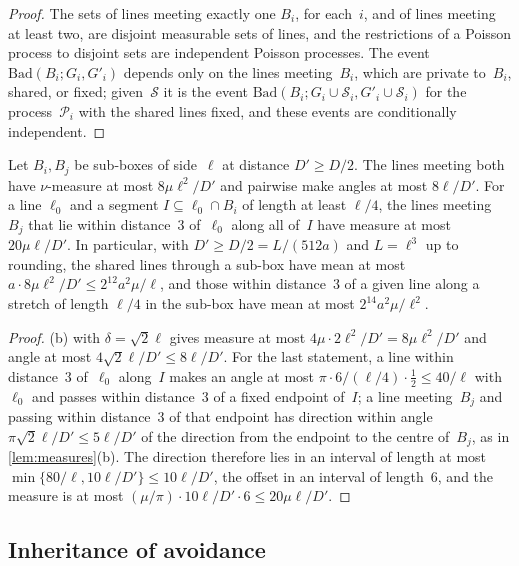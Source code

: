 \documentclass[11pt,letterpaper]{article}
\newcommand{\Bad}{\mathrm{Bad}}
\begin{document}
\begin{proof}
The sets of lines meeting exactly one $B_i$, for each~$i$, and of lines meeting at least two, are disjoint measurable sets of lines, and the restrictions of a Poisson process to disjoint sets are independent Poisson processes. The event $\Bad(B_i;G_i,G'_i)$ depends only on the lines meeting~$B_i$, which are private to~$B_i$, shared, or fixed; given~$\mathcal S$ it is the event $\Bad(B_i;G_i\cup\mathcal S_i,G'_i\cup\mathcal S_i)$ for the process~$\mathcal P_i$ with the shared lines fixed, and these events are conditionally independent.
\end{proof}

\begin{lemma}
\label{lem:sharedlines}
Let $B_i,B_j$ be sub-boxes of side~$\ell$ at distance $D'\ge D/2$. The lines meeting both have $\nu$-measure at most $8\mu\ell^2/D'$ and pairwise make angles at most $8\ell/D'$. For a line $\ell_0$ and a segment $I\subseteq\ell_0\cap B_i$ of length at least $\ell/4$, the lines meeting~$B_j$ that lie within distance~$3$ of~$\ell_0$ along all of~$I$ have measure at most $20\mu\ell/D'$. In particular, with $D'\ge D/2=L/(512a)$ and $L=\ell^3$ up to rounding, the shared lines through a sub-box have mean at most $a\cdot8\mu\ell^2/D'\le2^{12}a^2\mu/\ell$, and those within distance~$3$ of a given line along a stretch of length $\ell/4$ in the sub-box have mean at most $2^{14}a^2\mu/\ell^2$.
\end{lemma}

\begin{proof}
(b) with $\delta=\sqrt2\ell$ gives measure at most $4\mu\cdot2\ell^2/D'=8\mu\ell^2/D'$ and angle at most $4\sqrt2\ell/D'\le8\ell/D'$. For the last statement, a line within distance~$3$ of~$\ell_0$ along~$I$ makes an angle at most $\pi\cdot6/(\ell/4)\cdot\tfrac12\le40/\ell$ with~$\ell_0$ and passes within distance~$3$ of a fixed endpoint of~$I$; a line meeting~$B_j$ and passing within distance~$3$ of that endpoint has direction within angle $\pi\sqrt2\ell/D'\le5\ell/D'$ of the direction from the endpoint to the centre of~$B_j$, as in \cref{lem:measures}(b). The direction therefore lies in an interval of length at most $\min\{80/\ell,10\ell/D'\}\le10\ell/D'$, the offset in an interval of length~$6$, and the measure is at most $(\mu/\pi)\cdot10\ell/D'\cdot6\le20\mu\ell/D'$.
\end{proof}

\subsection{Inheritance of avoidance}
\end{document}
